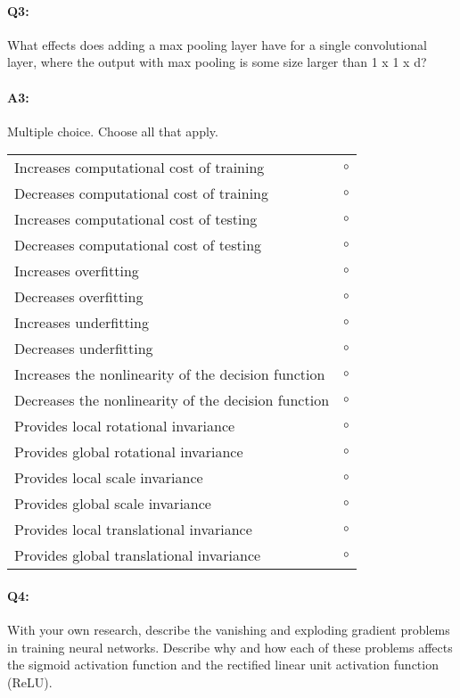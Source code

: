 
\pagebreak
\paragraph{Q3:} What effects does adding a max pooling layer have for a single convolutional layer, where the output with max pooling is some size larger than 1 x 1 x d?

\paragraph{A3:} Multiple choice. Choose all that apply.

\begin{tabular}[h]{lr}
\toprule
Increases computational cost of training & $\circ$ \\
Decreases computational cost of training & $\circ$ \\
Increases computational cost of testing & $\circ$ \\
Decreases computational cost of testing & $\circ$ \\
\midrule
Increases overfitting & $\circ$ \\
Decreases overfitting & $\circ$ \\
Increases underfitting & $\circ$ \\
Decreases underfitting & $\circ$ \\
\midrule
Increases the nonlinearity of the decision function & $\circ$ \\
Decreases the nonlinearity of the decision function & $\circ$ \\
\midrule
Provides local rotational invariance & $\circ$ \\
Provides global rotational invariance & $\circ$ \\
Provides local scale invariance & $\circ$ \\
Provides global scale invariance & $\circ$ \\
Provides local translational invariance & $\circ$ \\
Provides global translational invariance & $\circ$ \\
\bottomrule
\end{tabular}



\pagebreak
\paragraph{Q4:} With your own research, describe the vanishing and exploding gradient problems in training neural networks. Describe why and how each of these problems affects the sigmoid activation function and the rectified linear unit activation function (ReLU).

